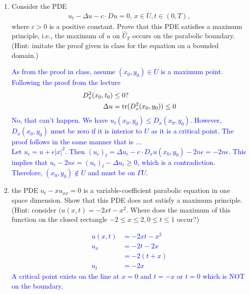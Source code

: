 \documentclass[10pt,a4paper]{report}
\newcommand{\BLUE}[1]{\textcolor{blue}{#1}}
\begin{document}
\begin{enumerate}
\begin{enumerate}[label=(\alph*)]
\end{enumerate}

\item Consider the PDE
\begin{align*}
	u_t-\Delta u-c\cdot Du=0,\, x\in U, t\in (0,T),
\end{align*}where $c>0$ is a positive constant.  Prove that this PDE satisfies a maximum principle, i.e., the maximum of $u$ on $\hat{U}_T$ occurs on the parabolic boundary. (Hint: imitate the proof given in class for the equation on a bounded domain.)

\BLUE{As from the proof in class, assume $(x_0,y_0) \in U$ is a maximum point.  Following the proof from the lecture 
\begin{align*}
	D^2_x(x_0,t_0) &\le 0 ?\\
	\Delta u &= \operatorname{tr} (D^2_x(x_0,y_0)) \le 0
\end{align*}No, that can't happen.  We have $u_t(x_0,y_0) \le D_x(x_0,y_0)$.  However, $D_x(x_0,y_0)$ must be zero if it is interior to $U$ as it is a critical point.  The proof follows in the same manner that is $\dots$ \\
Let $u_\epsilon = u + \epsilon |x|^2$. Then $(u_\epsilon)_t=\Delta u_\epsilon - c\cdot D_xu(x_0,y_0)- 2n\epsilon = -2n\epsilon$.  This implies that $u_\epsilon -2n\epsilon = (u_\epsilon)_t-\Delta u_\epsilon \ge 0$, which is a contradiction.  Therefore, $(x_0, y_0) \not \in U$ and must be on $\Gamma U$.
}

\item the PDE $u_t-xu_{xx}=0$ is a variable-coefficient parabolic equation in one space dimension.  Show that this PDE does not satisfy a maximum principle. (Hint:  consider $(u(x,t)=-2xt-x^2$.  Where does the maximum of this function on the closed rectangle $-2\le x\le 2,0\le t\le 1$ occur?)

\BLUE{
\begin{align*}
	u(x,t) &= -2xt-x^2 \\
	u_x &= -2t-2x \\
	&= -2 (t+x) \\
	u_t &= -2x
\end{align*}A critical point exists on the line at $x=0$ and $t=-x$ or $t=0$ which is NOT on the boundary.
}
\end{enumerate}
\end{document}
